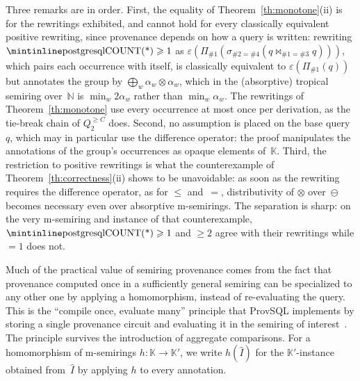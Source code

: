 \begin{toappendix}
Three remarks are in order. First, the equality of
Theorem~\ref{th:monotone}(ii) is for the rewritings exhibited, and
cannot hold for every classically equivalent positive rewriting, since
provenance depends on how a query is written: rewriting
$\text{\sql{COUNT(*)}}\geq 1$ as
$\varepsilon(\Pi_{\#1}(\sigma_{\#2=\#4}(q\bowtie_{\#1=\#3}q)))$, which
pairs each occurrence with itself, is classically equivalent to
$\varepsilon(\Pi_{\#1}(q))$ but annotates the group by
$\bigoplus_w\alpha_w\otimes\alpha_w$, which in the (absorptive)
tropical semiring over~$\mathbb N$ is $\min_w2\alpha_w$ rather than
$\min_w\alpha_w$. The rewritings of Theorem~\ref{th:monotone} use
every occurrence at most once per derivation, as the tie-break chain
of $Q^{\geq C}_2$ does. Second, no assumption is placed on the base
query~$q$, which may in particular use the difference operator: the
proof manipulates the annotations of the group's occurrences as
opaque elements of~$\mathbb K$. Third, the restriction to positive
rewritings is what the counterexample of
Theorem~\ref{th:correctness}(ii) shows to be unavoidable: as soon as
the rewriting requires the difference operator, as for $\leq$
and~$=$, distributivity of $\otimes$ over~$\ominus$ becomes necessary
even over absorptive m-semirings. The separation is sharp: on the very
m-semiring and instance of that counterexample,
$\text{\sql{COUNT(*)}}\geq 1$ and $\geq 2$ agree with their rewritings
while $=1$ does not.
\end{toappendix}

Much of the practical value of semiring provenance comes from the fact
that provenance computed once in a sufficiently general semiring can be
specialized to any other one by applying a homomorphism, instead of
re-evaluating the query. This is the ``compile once, evaluate many''
principle that ProvSQL implements by storing a single provenance circuit
and evaluating it in the semiring of interest~\cite{sen2026provsql}. The
principle survives the introduction of aggregate comparisons.
For a homomorphism of m-semirings $h:\mathbb K\to\mathbb K'$, we write $h(\hat I)$ for the $\mathbb
K'$-instance obtained from~$\hat I$ by applying $h$ to every annotation.

